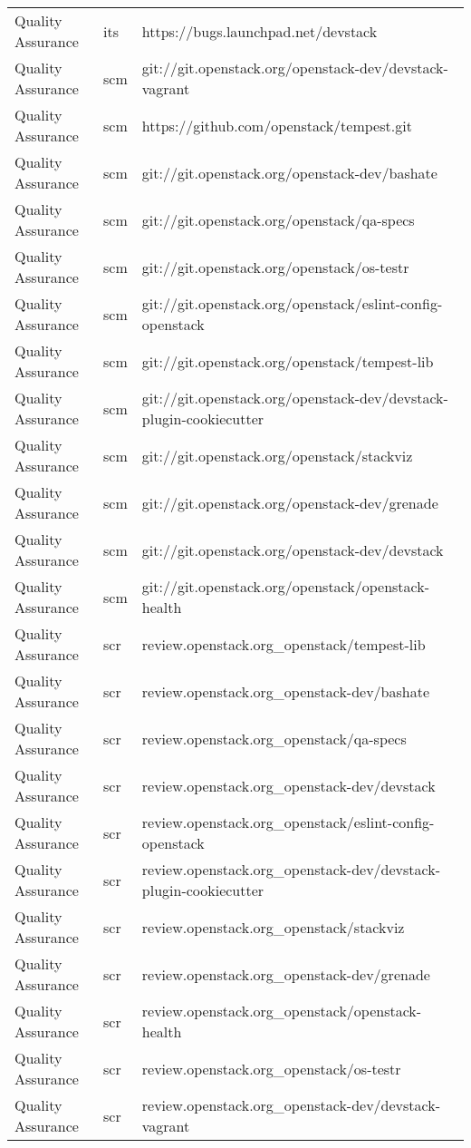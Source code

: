 \begin{center}
\begin{longtable}{|p{4cm}|p{1cm}|p{10cm}|}
Quality Assurance&its&https://bugs.launchpad.net/devstack\\ 
Quality Assurance&scm&git://git.openstack.org/openstack-dev/devstack-vagrant\\ 
Quality Assurance&scm&https://github.com/openstack/tempest.git\\ 
Quality Assurance&scm&git://git.openstack.org/openstack-dev/bashate\\ 
Quality Assurance&scm&git://git.openstack.org/openstack/qa-specs\\ 
Quality Assurance&scm&git://git.openstack.org/openstack/os-testr\\ 
Quality Assurance&scm&git://git.openstack.org/openstack/eslint-config-openstack\\ 
Quality Assurance&scm&git://git.openstack.org/openstack/tempest-lib\\ 
Quality Assurance&scm&git://git.openstack.org/openstack-dev/devstack-plugin-cookiecutter\\ 
Quality Assurance&scm&git://git.openstack.org/openstack/stackviz\\ 
Quality Assurance&scm&git://git.openstack.org/openstack-dev/grenade\\ 
Quality Assurance&scm&git://git.openstack.org/openstack-dev/devstack\\ 
Quality Assurance&scm&git://git.openstack.org/openstack/openstack-health\\ 
Quality Assurance&scr&review.openstack.org\_openstack/tempest-lib\\ 
Quality Assurance&scr&review.openstack.org\_openstack-dev/bashate\\ 
Quality Assurance&scr&review.openstack.org\_openstack/qa-specs\\ 
Quality Assurance&scr&review.openstack.org\_openstack-dev/devstack\\ 
Quality Assurance&scr&review.openstack.org\_openstack/eslint-config-openstack\\ 
Quality Assurance&scr&review.openstack.org\_openstack-dev/devstack-plugin-cookiecutter\\ 
Quality Assurance&scr&review.openstack.org\_openstack/stackviz\\ 
Quality Assurance&scr&review.openstack.org\_openstack-dev/grenade\\ 
Quality Assurance&scr&review.openstack.org\_openstack/openstack-health\\ 
Quality Assurance&scr&review.openstack.org\_openstack/os-testr\\ 
Quality Assurance&scr&review.openstack.org\_openstack-dev/devstack-vagrant\\ 

\end{longtable}
\end{center}
